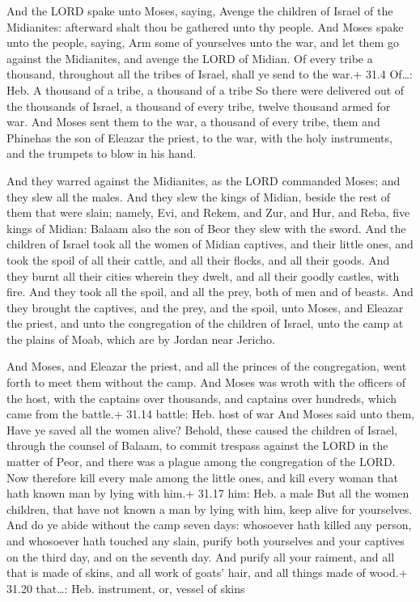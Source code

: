  And the LORD spake unto Moses, saying,  Avenge
the children of Israel of the Midianites: afterward shalt thou be
gathered unto thy people.  And Moses spake unto the people,
saying, Arm some of yourselves unto the war, and let them go against the
Midianites, and avenge the LORD of Midian.  Of every tribe a
thousand, throughout all the tribes of Israel, shall ye send to the
war.+ 31.4 Of\ldots: Heb. A thousand of a tribe, a thousand of a tribe
 So there were delivered out of the thousands of Israel, a
thousand of every tribe, twelve thousand armed for war.  And
Moses sent them to the war, a thousand of every tribe, them and Phinehas
the son of Eleazar the priest, to the war, with the holy instruments,
and the trumpets to blow in his hand.

 And they warred against the Midianites, as the LORD
commanded Moses; and they slew all the males.  And they slew
the kings of Midian, beside the rest of them that were slain; namely,
Evi, and Rekem, and Zur, and Hur, and Reba, five kings of Midian: Balaam
also the son of Beor they slew with the sword.  And the
children of Israel took all the women of Midian captives, and their
little ones, and took the spoil of all their cattle, and all their
flocks, and all their goods.  And they burnt all their
cities wherein they dwelt, and all their goodly castles, with fire.
 And they took all the spoil, and all the prey, both of men
and of beasts.  And they brought the captives, and the
prey, and the spoil, unto Moses, and Eleazar the priest, and unto the
congregation of the children of Israel, unto the camp at the plains of
Moab, which are by Jordan near Jericho.

 And Moses, and Eleazar the priest, and all the princes
of the congregation, went forth to meet them without the camp.
 And Moses was wroth with the officers of the host, with
the captains over thousands, and captains over hundreds, which came from
the battle.+ 31.14 battle: Heb. host of war  And Moses said
unto them, Have ye saved all the women alive?  Behold,
these caused the children of Israel, through the counsel of Balaam, to
commit trespass against the LORD in the matter of Peor, and there was a
plague among the congregation of the LORD.  Now therefore
kill every male among the little ones, and kill every woman that hath
known man by lying with him.+ 31.17 him: Heb. a male  But
all the women children, that have not known a man by lying with him,
keep alive for yourselves.  And do ye abide without the
camp seven days: whosoever hath killed any person, and whosoever hath
touched any slain, purify both yourselves and your captives on the third
day, and on the seventh day.  And purify all your raiment,
and all that is made of skins, and all work of goats' hair, and all
things made of wood.+ 31.20 that\ldots: Heb. instrument, or, vessel of
skins


